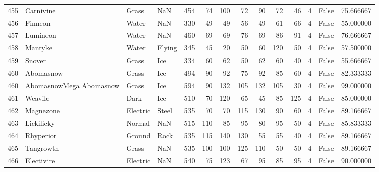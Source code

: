 \begin{tabular}{rlllrrrrrrrrlr}
 455 &                  Carnivine &     Grass &       NaN &    454 &   74 &     100 &       72 &       90 &       72 &     46 &           4 &      False &   75.666667 \\
 456 &                    Finneon &     Water &       NaN &    330 &   49 &      49 &       56 &       49 &       61 &     66 &           4 &      False &   55.000000 \\
 457 &                   Lumineon &     Water &       NaN &    460 &   69 &      69 &       76 &       69 &       86 &     91 &           4 &      False &   76.666667 \\
 458 &                    Mantyke &     Water &    Flying &    345 &   45 &      20 &       50 &       60 &      120 &     50 &           4 &      False &   57.500000 \\
 459 &                     Snover &     Grass &       Ice &    334 &   60 &      62 &       50 &       62 &       60 &     40 &           4 &      False &   55.666667 \\
 460 &                  Abomasnow &     Grass &       Ice &    494 &   90 &      92 &       75 &       92 &       85 &     60 &           4 &      False &   82.333333 \\
 460 &    AbomasnowMega Abomasnow &     Grass &       Ice &    594 &   90 &     132 &      105 &      132 &      105 &     30 &           4 &      False &   99.000000 \\
 461 &                    Weavile &      Dark &       Ice &    510 &   70 &     120 &       65 &       45 &       85 &    125 &           4 &      False &   85.000000 \\
 462 &                  Magnezone &  Electric &     Steel &    535 &   70 &      70 &      115 &      130 &       90 &     60 &           4 &      False &   89.166667 \\
 463 &                 Lickilicky &    Normal &       NaN &    515 &  110 &      85 &       95 &       80 &       95 &     50 &           4 &      False &   85.833333 \\
 464 &                  Rhyperior &    Ground &      Rock &    535 &  115 &     140 &      130 &       55 &       55 &     40 &           4 &      False &   89.166667 \\
 465 &                  Tangrowth &     Grass &       NaN &    535 &  100 &     100 &      125 &      110 &       50 &     50 &           4 &      False &   89.166667 \\
 466 &                 Electivire &  Electric &       NaN &    540 &   75 &     123 &       67 &       95 &       85 &     95 &           4 &      False &   90.000000 \\

\end{tabular}
